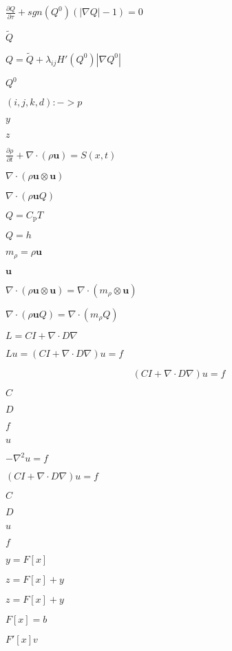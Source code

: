 \documentclass{article}
\begin{document}
$\frac{\partial Q}{\partial \tau}+sgn(Q^0)(|\nabla Q | - 1) = 0$
\pagebreak

$\tilde{Q}$
\pagebreak

$Q = \tilde{Q} + \lambda_{ij}H'(Q^0)|\nabla Q^0|$
\pagebreak

$Q^0$
\pagebreak

$ (i,j,k,d):-> p $
\pagebreak

$ y $
\pagebreak

$ z $
\pagebreak

$ \frac{\partial \rho}{\partial t} + \nabla \cdot (\rho \mathbf{u}) = S(x,t) $
\pagebreak

$ \nabla \cdot (\rho \mathbf{u} \otimes \mathbf{u})$
\pagebreak

$ \nabla \cdot (\rho \mathbf{u} Q)$
\pagebreak

$ Q = C_\textrm{p} T$
\pagebreak

$ Q = h$
\pagebreak

$ m_\rho = \rho \mathbf{u} $
\pagebreak

$ \mathbf{u} $
\pagebreak

$ \nabla \cdot (\rho \mathbf{u} \otimes \mathbf{u}) = \nabla \cdot (m_\rho \otimes \mathbf{u} ) $
\pagebreak

$ \nabla \cdot (\rho \mathbf{u} Q) = \nabla \cdot (m_\rho Q) $
\pagebreak

$ L = C I + \nabla \cdot D \nabla$
\pagebreak

$ \mbox{$L u$} = \mbox{$(C I + \nabla \cdot D \nabla) u$} = f $
\pagebreak

\[ (C I + \nabla \cdot D \nabla) u = f \]
\pagebreak

$ C $
\pagebreak

$ D $
\pagebreak

$ f $
\pagebreak

$ u $
\pagebreak

$ -\nabla^2 u = f $
\pagebreak

$ (C I + \nabla \cdot D \nabla ) u = f $
\pagebreak

$C$
\pagebreak

$D$
\pagebreak

$u$
\pagebreak

$f$
\pagebreak

$ y=F[x] $
\pagebreak

$ z=F[x]+y $
\pagebreak

$z=F[x]+y$
\pagebreak

$F[x]=b$
\pagebreak

$ F'[x]v $
\pagebreak
\end{document}
